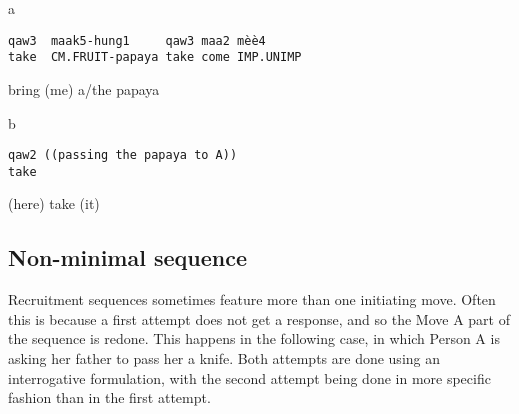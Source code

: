 \documentclass[output=paper]{langsci/langscibook}
\begin{document}
\vspace{-1mm}
%
\begin{mdframednoverticalspace}[style=firstfoc]
\begin{transbox}{1}{a}
\begin{verbatim}
qaw3  maak5-hung1     qaw3 maa2 mèè4
take  CM.FRUIT-papaya take come IMP.UNIMP
\end{verbatim}
bring (me) a/the papaya
\end{transbox}
\end{mdframednoverticalspace}
%
\begin{mdframednoverticalspace}[style=secondfoc]
\begin{transbox}{2}{b}
\begin{verbatim}
qaw2 ((passing the papaya to A))
take
\end{verbatim}
(here) take (it)
\end{transbox}
\end{mdframednoverticalspace}

\subsection{Non-minimal sequence}

Recruitment sequences sometimes feature more than one initiating move. Often this is because a first attempt does not get a response, and so the Move A part of the sequence is redone. This happens in the following case, in which Person A is asking her father to pass her a knife. Both attempts are done using an interrogative formulation, with the second attempt being done in more specific fashion than in the first attempt.
\end{document}
